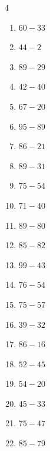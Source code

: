 \begin{multicols}{4}
\begin{enumerate}
  \item $60-33$
        \phantom{$=27$}

  \item $44-2$
        \phantom{$=42$}

  \item $89-29$
        \phantom{$=60$}

  \item $42-40$
        \phantom{$=2$}

  \item $67-20$
        \phantom{$=47$}

  \item $95-89$
        \phantom{$=6$}

  \item $86-21$
        \phantom{$=65$}

  \item $89-31$
        \phantom{$=58$}

  \item $75-54$
        \phantom{$=21$}

  \item $71-40$
        \phantom{$=31$}

  \item $89-80$
        \phantom{$=9$}

  \item $85-82$
        \phantom{$=3$}

  \item $99-43$
        \phantom{$=56$}

  \item $76-54$
        \phantom{$=22$}

  \item $75-57$
        \phantom{$=18$}

  \item $39-32$
        \phantom{$=7$}

  \item $86-16$
        \phantom{$=70$}

  \item $52-45$
        \phantom{$=7$}

  \item $54-20$
        \phantom{$=34$}

  \item $45-33$
        \phantom{$=12$}

  \item $75-47$
        \phantom{$=28$}

  \item $85-79$
        \phantom{$=6$}


\end{enumerate}
\end{multicols}
